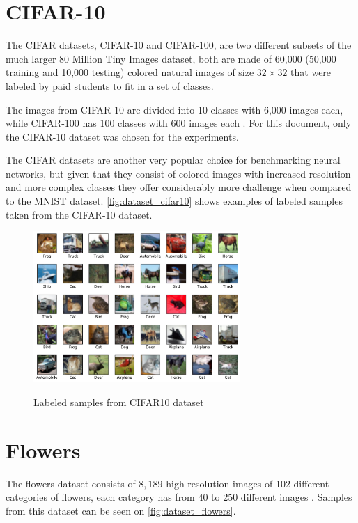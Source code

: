 \section{CIFAR-10} \label{sec:cifar}
The \gls{CIFAR} datasets, \gls{CIFAR}-10 and \gls{CIFAR}-100, are two different subsets of the much larger 80 Million Tiny Images dataset, both are made of 60,000 (50,000 training and 10,000 testing) colored natural images of size $32{\times}32$ that were labeled by paid students to fit in a set of classes.

The images from \gls{CIFAR}-10 are divided into 10 classes with 6,000 images each, while \gls{CIFAR}-100 has 100 classes with 600 images each \cite{cifar2009}. For this document, only the \gls{CIFAR}-10 dataset was chosen for the experiments.

The \gls{CIFAR} datasets are another very popular choice for benchmarking neural networks, but given that they consist of colored images with increased resolution and more complex classes they offer considerably more challenge when compared to the \gls{MNIST} dataset. \autoref{fig:dataset_cifar10} shows examples of labeled samples taken from the \gls{CIFAR}-10 dataset.
\begin{figure}[hbt]
    \centering
    \caption{Labeled samples from CIFAR10 dataset}
    \includegraphics[width=0.7\textwidth]{chapters/Datasets/figures/CIFAR10.pdf}
    \label{fig:dataset_cifar10}
\end{figure}



\section{Flowers} \label{sec:flowers}
The flowers dataset consists of $8,189$ high resolution images of 102 different categories of flowers, each category has from 40 to 250 different images \cite{flowers2008}. Samples from this dataset can be seen on \autoref{fig:dataset_flowers}.

